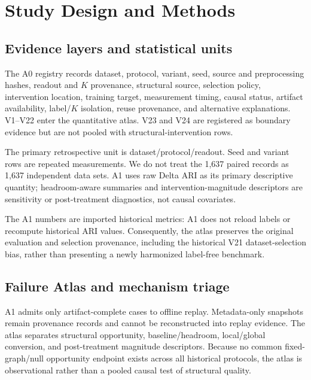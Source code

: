 \section{Study Design and Methods}

\subsection{Evidence layers and statistical units}

The A0 registry records dataset, protocol, variant, seed, source and
preprocessing hashes, readout and $K$ provenance, structural source, selection
policy, intervention location, training target, measurement timing, causal
status, artifact availability, label/$K$ isolation, reuse provenance, and
alternative explanations. V1--V22 enter the quantitative atlas. V23 and V24
are registered as boundary evidence but are not pooled with
structural-intervention rows.

The primary retrospective unit is dataset/protocol/readout. Seed and variant
rows are repeated measurements. We do not treat the 1,637 paired records as
1,637 independent data sets. A1 uses raw Delta ARI as its primary descriptive
quantity; headroom-aware summaries and intervention-magnitude descriptors are
sensitivity or post-treatment diagnostics, not causal covariates.

The A1 numbers are imported historical metrics: A1 does not reload labels or
recompute historical ARI values. Consequently, the atlas preserves the
original evaluation and selection provenance, including the historical V21
dataset-selection bias, rather than presenting a newly harmonized label-free
benchmark.

\begin{table}[t]
\centering
\caption{Evidence layers and their inferential boundary.}
\label{tab:layers}

\end{table}

\subsection{Failure Atlas and mechanism triage}

A1 admits only artifact-complete cases to offline replay. Metadata-only
snapshots remain provenance records and cannot be reconstructed into replay
evidence. The atlas separates structural opportunity, baseline/headroom,
local/global conversion, and post-treatment magnitude descriptors. Because no
common fixed-graph/null opportunity endpoint exists across all historical
protocols, the atlas is observational rather than a pooled causal test of
structural quality.

